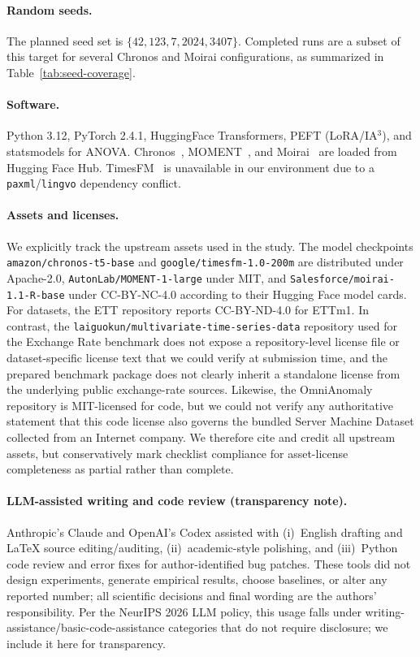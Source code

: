 \paragraph{Random seeds.} The planned seed set is $\{42, 123, 7, 2024, 3407\}$. Completed runs are a subset of this target for several Chronos and Moirai configurations, as summarized in Table~\ref{tab:seed-coverage}.

\paragraph{Software.} Python 3.12, PyTorch 2.4.1, HuggingFace Transformers, PEFT (LoRA/IA$^3$), and statsmodels for ANOVA. Chronos~\citep{ansari2024chronos}, MOMENT~\citep{goswami2024moment}, and Moirai~\citep{woo2024moirai} are loaded from Hugging Face Hub. TimesFM~\citep{das2024timesfm} is unavailable in our environment due to a \texttt{paxml}/\texttt{lingvo} dependency conflict.

\paragraph{Assets and licenses.} We explicitly track the upstream assets used in the study. The model checkpoints \texttt{amazon/chronos-t5-base} and \texttt{google/timesfm-1.0-200m} are distributed under Apache-2.0, \texttt{AutonLab/MOMENT-1-large} under MIT, and \texttt{Salesforce/moirai-1.1-R-base} under CC-BY-NC-4.0 according to their Hugging Face model cards. For datasets, the ETT repository reports CC-BY-ND-4.0 for ETTm1. In contrast, the \texttt{laiguokun/multivariate-time-series-data} repository used for the Exchange Rate benchmark does not expose a repository-level license file or dataset-specific license text that we could verify at submission time, and the prepared benchmark package does not clearly inherit a standalone license from the underlying public exchange-rate sources. Likewise, the OmniAnomaly repository is MIT-licensed for code, but we could not verify any authoritative statement that this code license also governs the bundled Server Machine Dataset collected from an Internet company. We therefore cite and credit all upstream assets, but conservatively mark checklist compliance for asset-license completeness as partial rather than complete.

\paragraph{LLM-assisted writing and code review (transparency note).} Anthropic's Claude and OpenAI's Codex assisted with (i)~English drafting and LaTeX source editing/auditing, (ii)~academic-style polishing, and (iii)~Python code review and error fixes for author-identified bug patches. These tools did not design experiments, generate empirical results, choose baselines, or alter any reported number; all scientific decisions and final wording are the authors' responsibility. Per the NeurIPS 2026 LLM policy, this usage falls under writing-assistance/basic-code-assistance categories that do not require disclosure; we include it here for transparency.

